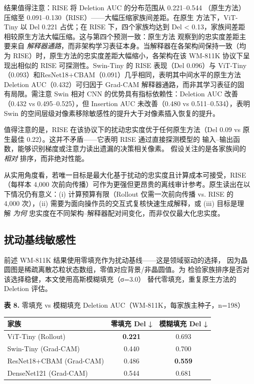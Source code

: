 \documentclass[11pt,a4paper]{article}
\begin{document}
结果值得注意：RISE 将 Deletion AUC 的分布范围从 0.221–0.544 （原生方法）压缩至 0.091–0.130（RISE）——大幅压缩家族间差距。在原生 方法下，ViT-Tiny 以 Del 0.221 占优；在 RISE 下，四个家族均达到 Del < 0.13，家族间差距相较原生方法大幅压缩。这与第四个预测一致：原生方法 观察到的忠实度差距主要来自 \emph{解释器通路}，而非架构学习表征本身。当解释器在各架构间保持一致（均为 RISE）时，原生方法的忠实度差距大幅缩小，各架构在该 WM-811K 协议下呈现出相似的 RISE 可探测性。Swin-Tiny 的 RISE 表现（Del 0.096）与 ViT-Tiny（0.093）和ResNet18+CBAM（0.091）几乎相同，表明其中间水平的原生方法Deletion AUC（0.432）可归因于 Grad-CAM 解释器通路，而非其学习表征的固有局限。需注意 Swin 相对 CNN 的优势具有指标依赖性：Deletion AUC 改善（0.432 vs 0.495–0.525），但 Insertion AUC 未改善（0.480 vs 0.511–0.534），表明 Swin 的空间层级对像素移除敏感性的提升大于对像素插入恢复的提升。

值得注意的是，RISE 在该协议下的扰动忠实度优于任何原生方法（Del 0.09 vs 原生最佳 0.22）。这并不矛盾——它表明 RISE 通过直接探测模型的 输入–输出函数，能够识别梯度或注意力读出遗漏的决策相关像素。 假设关注的是各家族间的 \emph{相对} 排序，而非绝对性能。

从实用角度看，若唯一目标是最大化基于扰动的忠实度且计算成本可接受，RISE（每样本 4,000 次前向传播）可作为更强但更昂贵的离线审计参考。原生读出在以下情况仍有意义：(i) 计算预算有限（Rollout 仅需一次前向传播 vs. RISE 的 4,000 次），(ii) 需要为面向操作员的交互式复核快速生成解释，或 (iii) 目标是理解 \emph{为何} 忠实度在不同架构–解释器配对间变化，而非仅仅最大化忠实度。


\subsection{扰动基线敏感性}

前述 WM-811K 结果使用零填充作为扰动基线——这是领域驱动的选择， 因为晶圆图是稀疏离散芯粒状态数组，零值对应背景/非晶圆值。为 检验家族排序是否对该选择稳健，本文使用高斯模糊填充（σ=3.0） 替代零填充，重复原生方法的 Deletion 评估。

\begin{center}
\small \textbf{表 8.} 零填充 vs 模糊填充 Deletion AUC（WM-811K，每家族主种子，n=198）
\end{center}

\begin{tabular}{lcc}
\toprule
家族 & 零填充 Del ↓ & 模糊填充 Del ↓ \\
\midrule
ViT-Tiny (Rollout) & \textbf{0.221} & 0.693 \\
Swin-Tiny (Grad-CAM) & 0.440 & 0.700 \\
ResNet18+CBAM (Grad-CAM) & 0.486 & \textbf{0.559} \\
DenseNet121 (Grad-CAM) & 0.544 & 0.681 \\
\bottomrule
\end{tabular}
\end{document}
